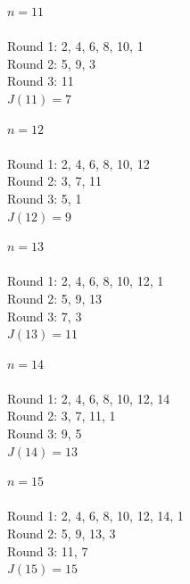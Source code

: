 \par\vspace{6pt}\noindent
\begin{minipage}[t]{0.32\linewidth}\centering
\textbf{$n=11$}\\[3pt]
{}\\[3pt]
{\scriptsize Round 1: 2, 4, 6, 8, 10, 1\\ Round 2: 5, 9, 3\\ Round 3: 11\\ $J(11)=7$}
\end{minipage}\hfill
\begin{minipage}[t]{0.32\linewidth}\centering
\textbf{$n=12$}\\[3pt]
{}\\[3pt]
{\scriptsize Round 1: 2, 4, 6, 8, 10, 12\\ Round 2: 3, 7, 11\\ Round 3: 5, 1\\ $J(12)=9$}
\end{minipage}\hfill
\begin{minipage}[t]{0.32\linewidth}\centering
\textbf{$n=13$}\\[3pt]
{\renewcommand{\nodesize}{4.6mm}}\\[3pt]
{\scriptsize Round 1: 2, 4, 6, 8, 10, 12, 1\\ Round 2: 5, 9, 13\\ Round 3: 7, 3\\ $J(13)=11$}
\end{minipage}\par\vspace{6pt}

\par\vspace{6pt}\noindent
\hfill
\begin{minipage}[t]{0.32\linewidth}\centering
\textbf{$n=14$}\\[3pt]
{\renewcommand{\nodesize}{4.6mm}}\\[3pt]
{\scriptsize Round 1: 2, 4, 6, 8, 10, 12, 14\\ Round 2: 3, 7, 11, 1\\ Round 3: 9, 5\\ $J(14)=13$}
\end{minipage}\hfill
\begin{minipage}[t]{0.32\linewidth}\centering
\textbf{$n=15$}\\[3pt]
{\renewcommand{\nodesize}{4.6mm}}\\[3pt]
{\scriptsize Round 1: 2, 4, 6, 8, 10, 12, 14, 1\\ Round 2: 5, 9, 13, 3\\ Round 3: 11, 7\\ $J(15)=15$}
\end{minipage}\hfill\null
\par\vspace{6pt}

